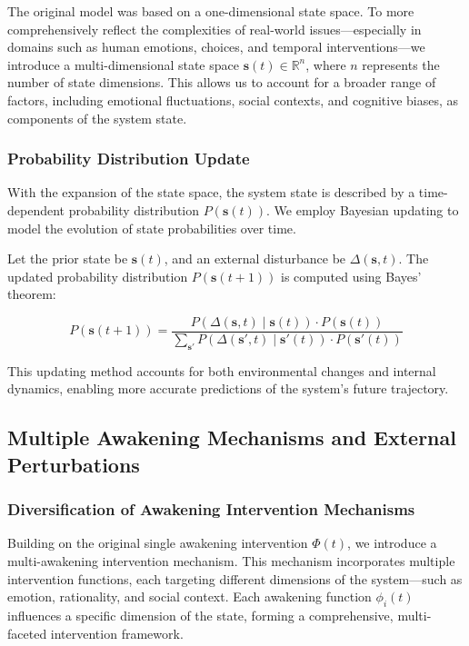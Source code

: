 \documentclass[12pt]{article}
\begin{document}
The original model was based on a one-dimensional state space. To more comprehensively reflect the complexities of real-world issues—especially in domains such as human emotions, choices, and temporal interventions—we introduce a multi-dimensional state space \( \mathbf{s}(t) \in \mathbb{R}^n \), where \( n \) represents the number of state dimensions. This allows us to account for a broader range of factors, including emotional fluctuations, social contexts, and cognitive biases, as components of the system state.

\subsubsection{Probability Distribution Update}

With the expansion of the state space, the system state is described by a time-dependent probability distribution \( P(\mathbf{s}(t)) \). We employ Bayesian updating to model the evolution of state probabilities over time.

Let the prior state be \( \mathbf{s}(t) \), and an external disturbance be \( \Delta(\mathbf{s}, t) \). The updated probability distribution \( P(\mathbf{s}(t+1)) \) is computed using Bayes' theorem:

\[
P(\mathbf{s}(t+1)) = \frac{P(\Delta(\mathbf{s}, t) \mid \mathbf{s}(t)) \cdot P(\mathbf{s}(t))}{\sum_{\mathbf{s}'} P(\Delta(\mathbf{s}', t) \mid \mathbf{s}'(t)) \cdot P(\mathbf{s}'(t))}
\]

This updating method accounts for both environmental changes and internal dynamics, enabling more accurate predictions of the system’s future trajectory.
\subsection{Multiple Awakening Mechanisms and External Perturbations}

\subsubsection{Diversification of Awakening Intervention Mechanisms}

Building on the original single awakening intervention \( \Phi(t) \), we introduce a multi-awakening intervention mechanism. This mechanism incorporates multiple intervention functions, each targeting different dimensions of the system—such as emotion, rationality, and social context. Each awakening function \( \phi_i(t) \) influences a specific dimension of the state, forming a comprehensive, multi-faceted intervention framework.
\end{document}
